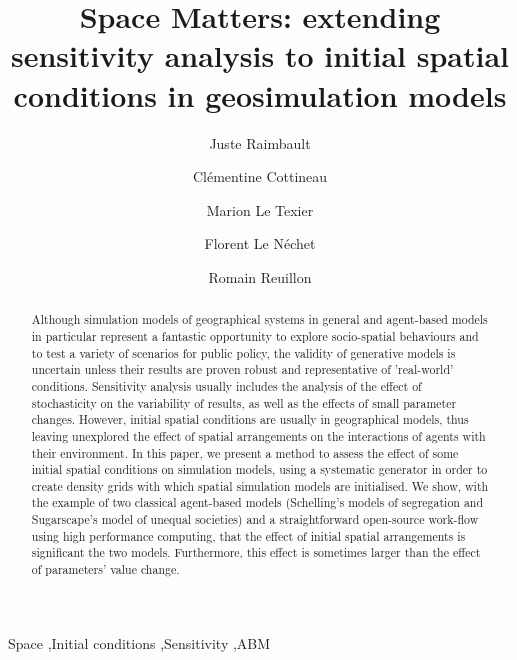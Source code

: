 \documentclass[preprint,5p,times,twocolumn,authoryear]{elsarticle}
\begin{document}
\begin{frontmatter}

\title{Space Matters: extending sensitivity analysis to initial spatial conditions in geosimulation models}

\author[a,b]{Juste Raimbault}
\author[c,d]{Cl{\' e}mentine Cottineau}
\author[e]{Marion Le Texier}
\author[f]{Florent Le N{\' e}chet}
\author[a]{Romain Reuillon}

\address[a]{UPS CNRS 3611 ISC-PIF, Paris, France}
\address[b]{UMR CNRS 8504 G{\'e}ographie-cit{\'e}s, Paris, France}
\address[c]{Centre for Advanced Spatial Analysis, University College London, UK}
\address[d]{UMR CNRS 8097 Centre Maurice Halbwachs, Paris, France}
\address[e]{UMR 6266 IDEES, Universit{\'e} de Rouen Normandie, France}
\address[f]{Universit{\'e} Paris-Est, Laboratoire Ville Mobilité Transport, Marne-la-Vallée, France}





\begin{abstract}
Although simulation models of geographical systems in general and agent-based models in particular represent a fantastic opportunity to explore socio-spatial behaviours and to test a variety of scenarios for public policy, the validity of generative models is uncertain unless their results are proven robust and representative of 'real-world' conditions. Sensitivity analysis usually includes the analysis of the effect of stochasticity on the variability of results, as well as the effects of small parameter changes. However, initial spatial conditions are usually  in geographical models, thus leaving  unexplored the effect of  spatial arrangements on the interactions of agents  with their environment. In this paper, we present a method to assess the effect of some initial spatial conditions on simulation models, using a systematic  generator  in order to create density grids with which spatial simulation models are initialised. We show, with the example of two classical agent-based models (Schelling's models of segregation and Sugarscape's model of unequal societies) and a straightforward open-source work-flow using high performance computing, that the effect of initial spatial arrangements is significant  the two models. Furthermore, this effect is sometimes larger than the effect of parameters' value change. 
\end{abstract}

\begin{keyword}
Space \sep Initial conditions \sep Sensitivity \sep ABM
\end{keyword}

\end{frontmatter}
\end{document}
